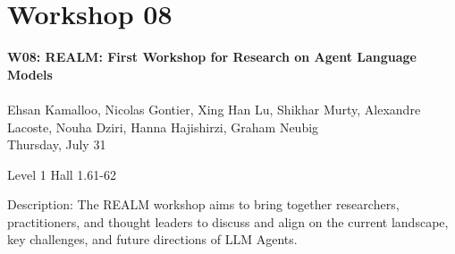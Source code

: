 \clearpage



\section[W08: REALM: First Workshop for Research on \\
Agent Language Models]{Workshop 08}
\label{workshop_8}

\begin{center}
    {\Large \textbf{W08: REALM: First Workshop for Research on Agent Language Models}}\\
\\

    Ehsan Kamalloo, Nicolas Gontier, Xing Han Lu, Shikhar Murty, Alexandre Lacoste, Nouha Dziri, Hanna Hajishirzi, Graham Neubig\\

    Thursday, July 31
    
    Level 1 Hall 1.61-62

\end{center}

Description: The REALM workshop aims to bring together researchers, practitioners, and thought leaders to discuss and align on the current landscape, key challenges, and future directions of LLM Agents.


